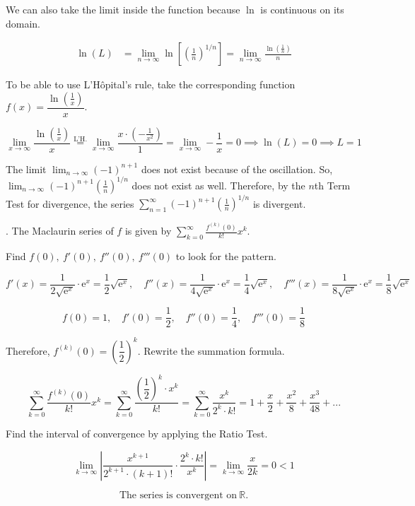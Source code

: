 \documentclass{article}
\begin{document}
\hfill

\noindent We can also take the limit inside the function because $\ln$ is continuous on its domain.

\begin{align*}\ln(L)&=\lim_{n\to\infty}\ln\left[\left(\frac1n\right)^{1/n}\right]=\lim_{n\to\infty}\frac{\ln\left(\frac1n\right)}{n}\end{align*}

\hfill

\noindent To be able to use L'Hôpital's rule, take the corresponding function $f(x)=\dfrac{\ln\left(\frac1x\right)}x$.

\[\lim_{x\to\infty}\frac{\ln\left(\frac1x\right)}x\overset{\text{L'H.}}{=}\lim_{x\to\infty}\frac{x\cdot\left(-\frac1{x^2}\right)}1=\lim_{x\to\infty}-\frac1x=0\implies \ln(L)=0\implies L=1\]

\hfill

\noindent The limit $\displaystyle\lim_{n\to\infty}(-1)^{n+1}$ does not exist because of the oscillation. So, $\displaystyle\lim_{n\to\infty}(-1)^{n+1}\left(\frac1n\right)^{1/n}$ does not exist as well. Therefore, by the $n$th Term Test for divergence, the series $\displaystyle\sum_{n=1}^{\infty}(-1)^{n+1}\left(\frac1n\right)^{1/n}$ is divergent.

\hfill

\hfill

. The Maclaurin series of $f$ is given by $\sum_{k=0}^{\infty}\frac{f^{(k)}(0)}{k!}x^k$.

\hfill

\noindent Find $f(0),\:f'(0),\:f''(0),\:f'''(0)$ to look for the pattern.

\[f'(x)=\frac1{2\sqrt{\mathrm{e}^x}}\cdot\mathrm{e}^x=\frac12\sqrt{\mathrm{e}^x},\quad f''(x)=\frac1{4\sqrt{\mathrm{e}^x}}\cdot\mathrm{e}^x=\frac14\sqrt{\mathrm{e}^x},\quad f'''(x)=\frac1{8\sqrt{\mathrm{e}^x}}\cdot\mathrm{e}^x=\frac18\sqrt{\mathrm{e}^x}\]

\[f(0)=1,\quad f'(0)=\frac12,\quad f''(0)=\frac14,\quad f'''(0)=\frac18\]

\hfill

\noindent Therefore, $f^{(k)}(0)=\left(\dfrac12\right)^k$. Rewrite the summation formula.

\[\sum_{k=0}^{\infty}\frac{f^{(k)}(0)}{k!}x^k=\sum_{k=0}^{\infty}\frac{\left(\dfrac12\right)^k\cdot x^k}{k!}=\boxed{\sum_{k=0}^{\infty}\frac{x^k}{2^k\cdot k!}=1+\frac{x}2+\frac{x^2}8+\frac{x^3}{48}+...}\]

\hfill

\noindent Find the interval of convergence by applying the Ratio Test.

\[\lim_{k\to\infty}\left|\frac{x^{k+1}}{2^{k+1}\cdot\left(k+1\right)!}\cdot\frac{2^k\cdot k!}{x^k}\right|=\lim_{k\to\infty}\frac{x}{2k}=0<1\]

\hfill

\[\boxed{\text{The series is convergent on}\:\mathbb{R}.}\]
\end{document}
